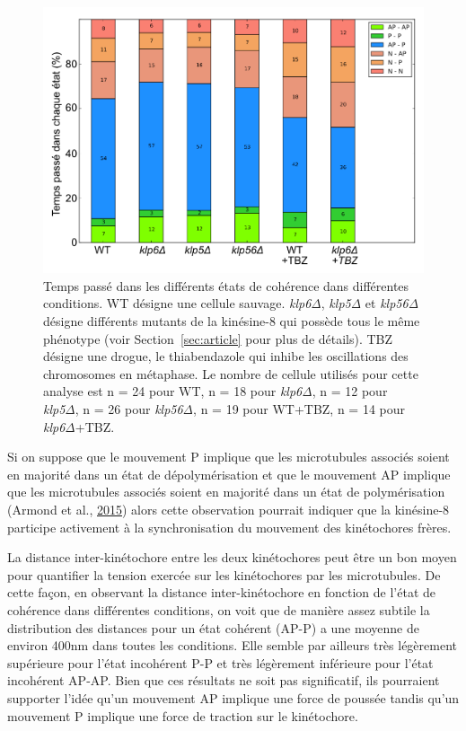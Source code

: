 \documentclass[12pt,a4paper,twoside,openright]{book}
\begin{document}
\begin{figure}[htbp]
\centering
\includegraphics{figures/results/imaging/coherence_stats.png}
\caption[Temps passé dans les différents états de cohérence dans différentes conditions]{\label{fig:coherence-stats}Temps
passé dans les différents états de cohérence dans différentes
conditions. WT désigne une cellule sauvage. \emph{klp6Δ}, \emph{klp5Δ}
et \emph{klp56Δ} désigne différents mutants de la kinésine-8 qui possède
tous le même phénotype (voir Section~\ref{sec:article} pour plus de
détails). TBZ désigne une drogue, le thiabendazole qui inhibe les
oscillations des chromosomes en métaphase. Le nombre de cellule utilisés
pour cette analyse est n = 24 pour WT, n = 18 pour \emph{klp6Δ}, n = 12
pour \emph{klp5Δ}, n = 26 pour \emph{klp56Δ}, n = 19 pour WT+TBZ, n = 14
pour \emph{klp6Δ}+TBZ.}
\end{figure}

Si on suppose que le mouvement P implique que les microtubules associés
soient en majorité dans un état de dépolymérisation et que le mouvement
AP implique que les microtubules associés soient en majorité dans un
état de polymérisation (Armond et al., \hyperref[ref-Armond2015]{2015})
alors cette observation pourrait indiquer que la kinésine-8 participe
activement à la synchronisation du mouvement des kinétochores frères.

La distance inter-kinétochore entre les deux kinétochores peut être un
bon moyen pour quantifier la tension exercée sur les kinétochores par
les microtubules. De cette façon, en observant la distance
inter-kinétochore en fonction de l'état de cohérence dans différentes
conditions, on voit que de manière assez subtile la distribution des
distances pour un état cohérent (AP-P) a une moyenne de environ 400nm
dans toutes les conditions. Elle semble par ailleurs très légèrement
supérieure pour l'état incohérent P-P et très légèrement inférieure pour
l'état incohérent AP-AP. Bien que ces résultats ne soit pas
significatif, ils pourraient supporter l'idée qu'un mouvement AP
implique une force de poussée tandis qu'un mouvement P implique une
force de traction sur le kinétochore.
\end{document}
